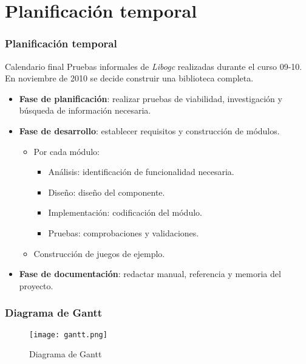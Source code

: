 

\section{Planificación temporal}
\begin{frame}
\frametitle{Planificación temporal}
	\begin{block}{Calendario final}
	\noindent Pruebas informales de \emph{Libogc} realizadas durante el curso 09-10.\\
	En noviembre de 2010 se decide construir una biblioteca completa.
	\begin{itemize}
		\item \textbf{Fase de planificación}: realizar pruebas de viabilidad, investigación y búsqueda de información necesaria.
		\item \textbf{Fase de desarrollo}: establecer requisitos y construcción de módulos.
		\begin{itemize}
			\item Por cada módulo:
			\begin{itemize}
				\item Análisis: identificación de funcionalidad necesaria.
				\item Diseño: diseño del componente.
				\item Implementación: codificación del módulo.
				\item Pruebas: comprobaciones y validaciones.
			\end{itemize}
			\item Construcción de juegos de ejemplo.
		\end{itemize}
	    \item \textbf{Fase de documentación}: redactar manual, referencia y memoria del proyecto.
	\end{itemize}
	\end{block}
\end{frame}

\begin{frame}
\frametitle{Diagrama de Gantt}
	\begin{figure}[H]
		\label{gantt}
		\begin{center}
		\texttt{[image: gantt.png]}
		\end{center}
		\caption{Diagrama de Gantt}
	\end{figure}
\end{frame}

